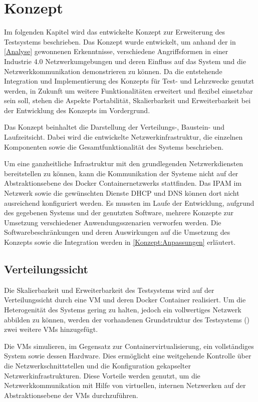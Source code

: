 \chapter{Konzept}
\label{Konzept}
Im folgenden Kapitel wird das entwickelte Konzept zur Erweiterung des Testsystems beschrieben. Das Konzept wurde entwickelt, um anhand der in \autoref{Analyse} gewonnenen Erkenntnisse, verschiedene Angriffsformen in einer Industrie 4.0 Netzwerkumgebungen und deren Einfluss auf das System und die Netzwerkkommunikation demonstrieren zu können. Da die entstehende Integration und Implementierung des Konzepts für Test- und Lehrzwecke genutzt werden, in Zukunft um weitere Funktionalitäten erweitert und flexibel einsetzbar sein soll, stehen die Aspekte Portabilität, Skalierbarkeit und Erweiterbarkeit bei der Entwicklung des Konzepts im Vordergrund.

Das Konzept beinhaltet die Darstellung der Verteilungs-, Baustein- und Laufzeitsicht. Dabei wird die entwickelte Netzwerkinfrastruktur, die einzelnen Komponenten sowie die Gesamtfunktionalität des Systems beschrieben.

Um eine ganzheitliche Infrastruktur mit den grundlegenden Netzwerkdiensten bereitstellen zu können, kann die Kommunikation der Systeme nicht auf der Abstraktionsebene des Docker Containernetzwerks stattfinden. Das \ac{IPAM} im Netzwerk sowie die gewünschten Dienste \ac{DHCP} und \ac{DNS} können dort nicht ausreichend konfiguriert werden. Es mussten im Laufe der Entwicklung, aufgrund des gegebenen Systems und der genutzten Software, mehrere Konzepte zur Umsetzung verschiedener Anwendungsszenarien verworfen werden. Die Softwarebeschränkungen und deren Auswirkungen auf die Umsetzung des Konzepts sowie die Integration werden in \autoref{Konzept:Anpassungen} erläutert.

\section{Verteilungssicht}
Die Skalierbarkeit und Erweiterbarkeit des Testsystems wird auf der Verteilungssicht durch eine \ac{VM} und deren Docker Container realisiert. Um die Heterogenität des Systems gering zu halten, jedoch ein vollwertiges Netzwerk abbilden zu können, werden der vorhandenen Grundstruktur des Testsystems (\cite{Weber2018}) zwei weitere \ac{VM}s hinzugefügt.

Die \ac{VM}s simulieren, im Gegensatz zur Containervirtualisierung, ein vollständiges System sowie dessen Hardware. Dies ermöglicht eine weitgehende Kontrolle über die Netzwerkschnittstellen und die Konfiguration gekapselter Netzwerkinfrastrukturen. Diese Vorteile werden genutzt, um die Netzwerkkommunikation mit Hilfe von virtuellen, internen Netzwerken auf der Abstraktionsebene der \ac{VM}s durchzuführen.

